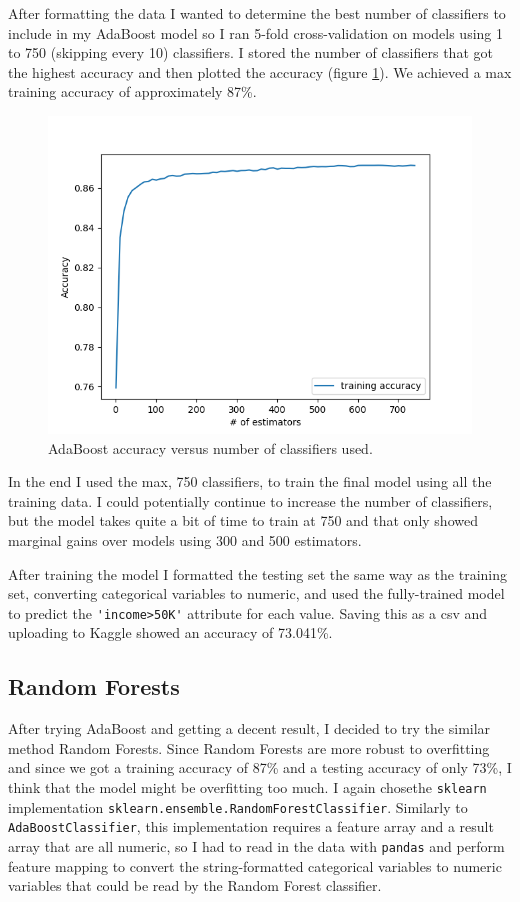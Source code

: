 \documentclass[conference]{IEEEtran}
\begin{document}
        After formatting the data I wanted to determine the best number of classifiers to include in my AdaBoost model so I ran 5-fold cross-validation on models using 1 to 750 (skipping every 10) classifiers. I stored the number of classifiers that got the highest accuracy and then plotted the accuracy (figure \ref{fig:ab_acc}). We achieved a max training accuracy of approximately 87\%.
        \begin{figure}[h]
            \centering
            \includegraphics[width=0.75\linewidth]{./img/ab_acc.png}
            \caption{AdaBoost accuracy versus number of classifiers used.}
            \label{fig:ab_acc}
        \end{figure}

        In the end I used the max, 750 classifiers, to train the final model using all the training data. I could potentially continue to increase the number of classifiers, but the model takes quite a bit of time to train at 750 and that only showed marginal gains over models using 300 and 500 estimators.

        After training the model I formatted the testing set the same way as the training set, converting categorical variables to numeric, and used the fully-trained model to predict the \lstinline|'income>50K'| attribute for each value. Saving this as a csv and uploading to Kaggle showed an accuracy of 73.041\%. 

    \subsection{Random Forests}
        After trying AdaBoost and getting a decent result, I decided to try the similar method Random Forests. Since Random Forests are more robust to overfitting and since we got a training accuracy of 87\% and a testing accuracy of only 73\%, I think that the model might be overfitting too much. I again chosethe \lstinline{sklearn} implementation \lstinline{sklearn.ensemble.RandomForestClassifier}. Similarly to \lstinline{AdaBoostClassifier}, this implementation requires a feature array and a result array that are all numeric, so I had to read in the data with \lstinline{pandas} and perform feature mapping to convert the string-formatted categorical variables to numeric variables that could be read by the Random Forest classifier. 
\end{document}
